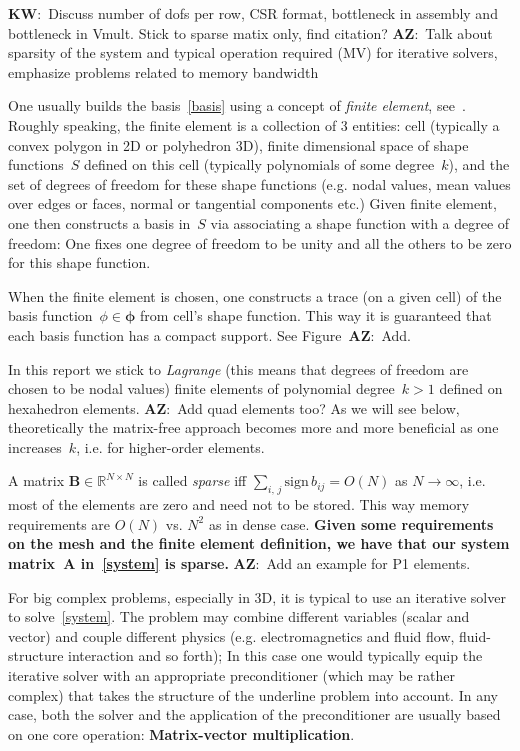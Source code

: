 \documentclass[12pt]{article}
\newcommand{\vect}[1]{\boldsymbol{\mathbf{#1}}}
\newcommand{\AZ}[1]{{\color{red}\textbf{AZ}:~#1}}
\newcommand{\KW}[1]{{\color{blue}\textbf{KW}:~#1}}
\newcommand{\dimSize}{N}
\begin{document}
\KW{Discuss number of dofs per row, CSR format, bottleneck in assembly and bottleneck in Vmult. Stick to sparse matix only, find citation?} 
\AZ{Talk about sparsity of the system and typical operation required (MV) for iterative solvers, emphasize problems related to memory bandwidth}


One usually builds the basis~\eqref{basis} using a concept of \textit{finite element}, see~\cite{ciarlet2002finite}. Roughly speaking, the finite element is a collection of 3 entities: cell (typically a convex polygon in 2D or polyhedron 3D), finite dimensional space of shape functions~$S$ defined on this cell (typically polynomials of some degree~$k$), and the set of degrees of freedom for these shape functions (e.g. nodal values, mean values over edges or faces, normal or tangential components etc.) Given finite element, one then constructs a basis in~$S$ via associating a shape function with a degree of freedom: One fixes one degree of freedom to be unity and all the others to be zero for this shape function. 

When the finite element is chosen, one constructs a trace (on a given cell) of the basis function~${\phi \in \vect\phi}$ from cell's shape function. This way it is guaranteed that each basis function has a compact support. See Figure~\AZ{Add.}

In this report we stick to \textit{Lagrange} (this means that degrees of freedom are chosen to be nodal values) finite elements of polynomial degree~$k > 1$ defined on hexahedron elements. \AZ{Add quad elements too?} As we will see below, theoretically the matrix-free approach becomes more and more beneficial as one increases~$k$, i.e. for higher-order elements. 

A matrix $\vect B \in \mathbb R^{\dimSize\times\dimSize}$ is called \textit{sparse} iff $\sum_{i,\,j} \mbox{sign}\,b_{ij} = O(\dimSize)$ as $\dimSize \rightarrow \infty$, i.e. most of the elements are zero and need not to be stored. This way memory requirements are $O(\dimSize)$ vs. $\dimSize^2$ as in dense case. \textbf{Given some requirements on the mesh and the finite element definition, we have that our system matrix~$\vect A$ in~\eqref{system} is sparse.} \AZ{Add an example for P1 elements.}

For big complex problems, especially in 3D, it is typical to use an iterative solver to solve~\eqref{system}. The problem may combine different variables (scalar and vector) and couple different physics (e.g. electromagnetics and fluid flow, fluid-structure interaction and so forth); In this case one would typically equip the iterative solver with an appropriate preconditioner (which may be rather complex) that takes the structure of the underline problem into account. In any case, both the solver and the application of the preconditioner are usually based on one core operation: \textbf{Matrix-vector multiplication}.
\end{document}
